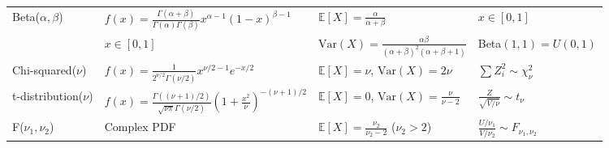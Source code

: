 \documentclass[10pt,letterpaper]{article}
\newcommand{\Var}{\text{Var}}
\newcommand{\E}{\mathbb{E}}
\begin{document}
\begin{center}
\begin{tabular}{|l|l|l|l|}
\hline
Beta($\alpha,\beta$) & $f(x)=\frac{\Gamma(\alpha+\beta)}{\Gamma(\alpha)\Gamma(\beta)}x^{\alpha-1}(1-x)^{\beta-1}$ & $\E[X]=\frac{\alpha}{\alpha+\beta}$ & $x \in [0,1]$ \\
 & $x \in [0,1]$ & $\Var(X)=\frac{\alpha\beta}{(\alpha+\beta)^2(\alpha+\beta+1)}$ & Beta$(1,1)=U(0,1)$ \\
\hline
Chi-squared($\nu$) & $f(x)=\frac{1}{2^{\nu/2}\Gamma(\nu/2)}x^{\nu/2-1}e^{-x/2}$ & $\E[X]=\nu$, $\Var(X)=2\nu$ & $\sum Z_i^2 \sim \chi^2_\nu$ \\
\hline
t-distribution($\nu$) & $f(x)=\frac{\Gamma((\nu+1)/2)}{\sqrt{\nu\pi}\Gamma(\nu/2)}\left(1+\frac{x^2}{\nu}\right)^{-(\nu+1)/2}$ & $\E[X]=0$, $\Var(X)=\frac{\nu}{\nu-2}$ & $\frac{Z}{\sqrt{V/\nu}} \sim t_\nu$ \\
\hline
F($\nu_1,\nu_2$) & Complex PDF & $\E[X]=\frac{\nu_2}{\nu_2-2}$ ($\nu_2>2$) & $\frac{U/\nu_1}{V/\nu_2} \sim F_{\nu_1,\nu_2}$ \\
\hline
\end{tabular}
\end{center}
\end{document}
